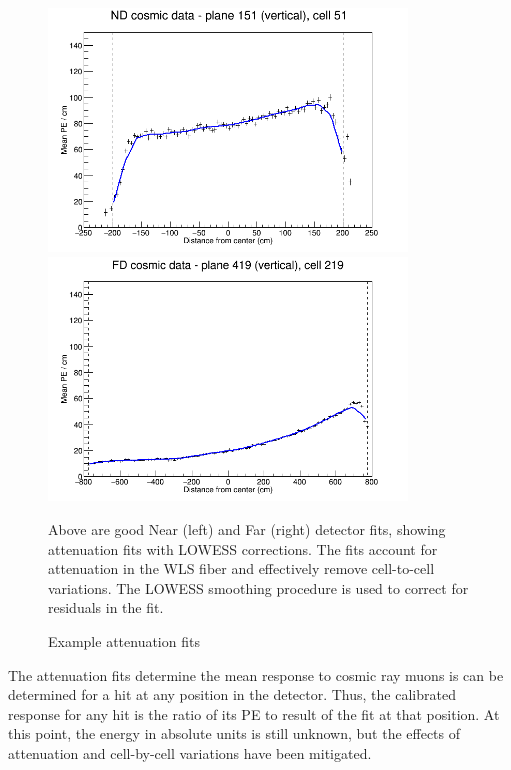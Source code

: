 \begin{figure}
\begin{center}
  \includegraphics[width=0.85\textwidth]{figures/plots/reco/calib_totfit_data_inX_151_051}

  \includegraphics[width=0.85\textwidth]{figures/plots/reco/calib_totfit_data_inX_419_219}
  \end{center}
  \caption[]{Example attenuation fits}{
  Above are  good Near (left) and Far (right) detector fits,
  showing attenuation fits with LOWESS corrections.  The fits account
  for attenuation in the WLS fiber and effectively remove cell-to-cell
  variations.
  The LOWESS \cite{cleveland1981lowess} smoothing procedure
  is used to correct for residuals in the fit.  }\label{calib_atten}
\end{figure}

The attenuation fits determine the mean response to cosmic ray muons is
can be determined for a hit at any position in the detector.
Thus, the calibrated response for any hit is the ratio of its PE to result of
the fit at that position.  At this point, the energy in absolute units is
still unknown, but the effects of attenuation and cell-by-cell variations
have been mitigated.

